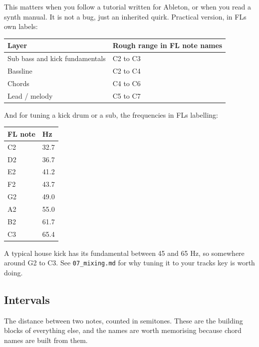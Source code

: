 This matters when you follow a tutorial written for Ableton, or when you read a synth manual.
It is not a bug, just an inherited quirk. Practical version, in FL\textquotesingle s own labels:

{\def\LTcaptype{none} %
\begin{longtable}[]{@{}ll@{}}
\toprule\noalign{}
Layer & Rough range in FL note names \\
\midrule\noalign{}
\endhead
\bottomrule\noalign{}
\endlastfoot
Sub bass and kick fundamentals & C2 to C3 \\
Bassline & C2 to C4 \\
Chords & C4 to C6 \\
Lead / melody & C5 to C7 \\
\end{longtable}
}

And for tuning a kick drum or a sub, the frequencies in FL\textquotesingle s labelling:

{\def\LTcaptype{none} %
\begin{longtable}[]{@{}ll@{}}
\toprule\noalign{}
FL note & Hz \\
\midrule\noalign{}
\endhead
\bottomrule\noalign{}
\endlastfoot
C2 & 32.7 \\
D2 & 36.7 \\
E2 & 41.2 \\
F2 & 43.7 \\
G2 & 49.0 \\
A2 & 55.0 \\
B2 & 61.7 \\
C3 & 65.4 \\
\end{longtable}
}

A typical house kick has its fundamental between 45 and 65 Hz, so somewhere around G2 to
C3. See \texttt{07\_mixing.md} for why tuning it to your track\textquotesingle s key is worth doing.

\subsection{Intervals}\label{th04_harmony-intervals}

The distance between two notes, counted in semitones. These are the building blocks of
everything else, and the names are worth memorising because chord names are built from them.

